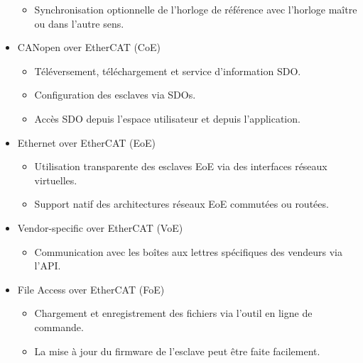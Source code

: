 \documentclass[a4paper,12pt,BCOR6mm,bibtotoc,idxtotoc]{scrbook}
\begin{document}
\begin{itemize}
\begin{itemize}
  \item Synchronisation optionnelle de l'horloge de r\'ef\'erence avec
    l'horloge ma\^itre ou dans l'autre sens.

  \end{itemize}

\item CANopen over EtherCAT (CoE)

  \begin{itemize}

  \item T\'el\'eversement, t\'el\'echargement et service d'information SDO.

  \item Configuration des esclaves via SDOs.

  \item Acc\`es SDO depuis l'espace utilisateur et depuis l'application.

  \end{itemize}

\item Ethernet over EtherCAT (EoE)

  \begin{itemize}

  \item Utilisation transparente des esclaves EoE via des interfaces
    r\'eseaux virtuelles.

  \item Support natif des architectures r\'eseaux EoE commut\'ees ou
    rout\'ees.

  \end{itemize}

\item Vendor-specific over EtherCAT (VoE)

  \begin{itemize}

  \item Communication avec les bo\^ites aux lettres sp\'ecifiques des
    vendeurs via l'API.

  \end{itemize}

\item File Access over EtherCAT (FoE)

  \begin{itemize}

  \item Chargement et enregistrement des fichiers via l'outil en ligne
    de commande.

  \item La mise \`a jour du firmware de l'esclave peut \^etre faite
    facilement.


\end{itemize}
\end{itemize}
\end{document}
